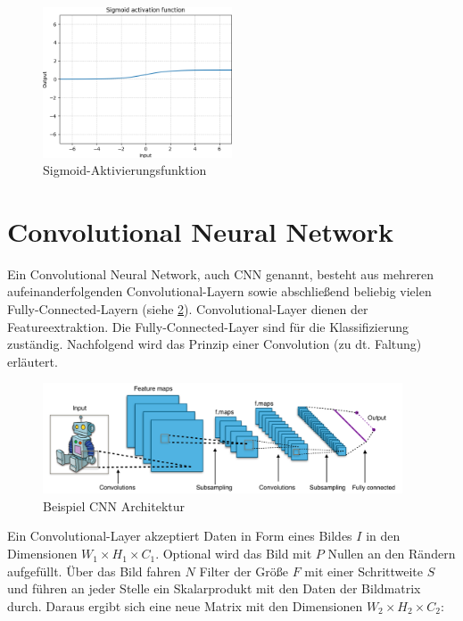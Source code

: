 \begin{figure}[H]
	\centering
	\includegraphics[width=0.50\textwidth]{resources/content/Sigmoid.png}
	\caption{Sigmoid-Aktivierungsfunktion \cite{sigmoid_activation_function_img}}
	\label{img:sigmoid_activation_function}
\end{figure}

\section{Convolutional Neural Network}
\label{sec:conv_networks}

Ein Convolutional Neural Network, auch CNN genannt, besteht aus mehreren aufeinanderfolgenden Convolutional-Layern sowie
abschließend beliebig vielen Fully-Connected-Layern (siehe \ref{img:cnn_example_network}). Convolutional-Layer dienen der Featureextraktion. Die Fully-Connected-Layer sind für die Klassifizierung zuständig. Nachfolgend wird das Prinzip einer Convolution (zu dt. Faltung) erläutert.

\begin{figure}[H]
	\centering
	\includegraphics[width=0.95\textwidth]{resources/content/cnn/typical_cnn.png}
	\caption{Beispiel CNN Architektur \cite{typical_cnn_img}}
	\label{img:cnn_example_network}
\end{figure}

Ein Convolutional-Layer akzeptiert Daten in Form eines Bildes $ I $ in den Dimensionen $ W_1 \times H_1 \times C_1 $. Optional wird das Bild mit $ P $ Nullen an den Rändern aufgefüllt. Über das Bild fahren $ N $ Filter der Größe $ F $ mit einer Schrittweite $ S $ und führen an jeder Stelle ein Skalarprodukt mit den Daten der Bildmatrix durch. Daraus ergibt sich eine neue Matrix mit den Dimensionen $ W_2 \times H_2 \times C_2 $:

